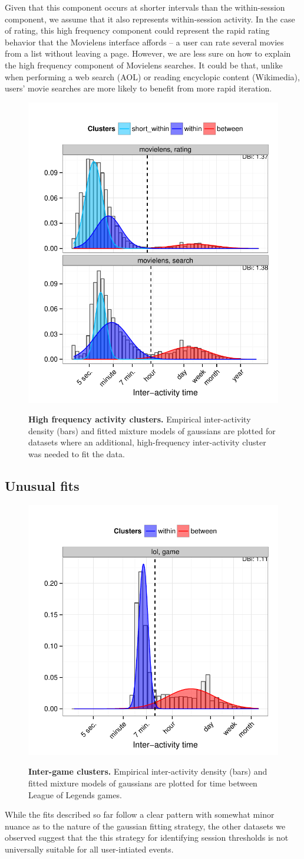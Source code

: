 Given that this component occurs at shorter intervals than the within-session component, we assume that it also represents within-session activity.  In the case of rating, this high frequency component could represent the rapid rating behavior that the Movielens interface affords -- a user can rate several movies from a list without leaving a page.  However, we are less sure on how to explain the high frequency component of Movielens searches.  It could be that, unlike when performing a web search (AOL) or reading encyclopic content (Wikimedia), users' movie searches are more likely to benefit from more rapid iteration.
\begin{figure}
\centering
\includegraphics[width=.45\textwidth]{figures/operation_mixed_clusters.pdf}
\label{fig:operation_mixed_clusters}
\caption{
    \textbf{High frequency activity clusters.} Empirical inter-activity density (bars) and fitted mixture models of gaussians are plotted for datasets where an additional, high-frequency inter-activity cluster was needed to fit the data.
}
\end{figure}

\subsection{Unusual fits}
\begin{figure}
\centering
\includegraphics[width=.45\textwidth]{figures/weird_lol_clusters.pdf}
\label{fig:lol_game_clusters}
\caption{
    \textbf{Inter-game clusters.} Empirical inter-activity density (bars) and fitted mixture models of gaussians are plotted for time between League of Legends games.
}
\end{figure}
While the fits described so far follow a clear pattern with somewhat minor nuance as to the nature of the gaussian fitting strategy, the other datasets we observed suggest that the this strategy for identifying session thresholds is not universally suitable for all user-intiated events.

